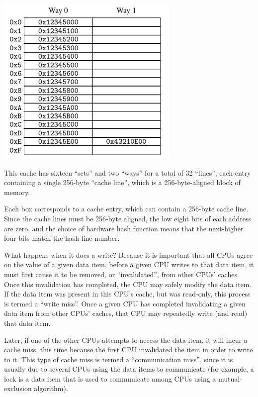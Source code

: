 \documentclass[11pt]{article}
\begin{document}
\begin{center}
\includegraphics[width=.8\textwidth]{../images/perfbook/2.png}
\end{center}

This cache has sixteen “sets” and two “ways” for a total of 32 “lines”, each entry containing a
single 256-byte “cache line”, which is a 256-byte-aligned block of memory.

Each box corresponds to a cache entry, which can contain a 256-byte cache line. Since the cache
lines must be 256-byte aligned, the low eight bits of each address are zero, and the choice of
hardware hash function means that the next-higher four bits match the hash line number.

What happens when it does a write? Because it is important that all CPUs agree on the value of a
given data item, before a given CPU writes to that data item, it must first cause it to be
removed, or “invalidated”, from other CPUs’ caches. Once this invalidation has completed, the
CPU may safely modify the data item. If the data item was present in this CPU’s cache, but was
read-only, this process is termed a “write miss”. Once a given CPU has completed invalidating a
given data item from other CPUs’ caches, that CPU may repeatedly write (and read) that data
item.

Later, if one of the other CPUs attempts to access the data item, it will incur a cache miss,
this time because the first CPU invalidated the item in order to write to it. This type of cache
miss is termed a “communication miss”, since it is usually due to several CPUs using the data
items to communicate (for example, a lock is a data item that is used to communicate among CPUs
using a mutual-exclusion algorithm).
\end{document}
